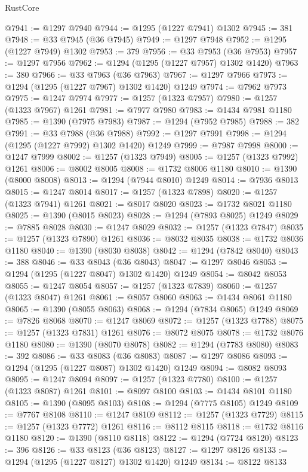 \begin{lexlean}{RustCore}
\begin{coremodule}
@7941 := @1297 @7940
@7944 := @1295 (@1227 @7941) @1302
@7945 := 381
@7948 := @33 @7945 (@36 @7945)
@7949 := @1297 @7948
@7952 := @1295 (@1227 @7949) @1302
@7953 := 379
@7956 := @33 @7953 (@36 @7953)
@7957 := @1297 @7956
@7962 := @1294 (@1295 (@1227 @7957) @1302 @1420)
@7963 := 380
@7966 := @33 @7963 (@36 @7963)
@7967 := @1297 @7966
@7973 := @1294 (@1295 (@1227 @7967) @1302 @1420) @1249
@7974 := @7962 @7973
@7975 := @1247 @7974
@7977 := @1257 (@1323 @7957)
@7980 := @1257 (@1323 @7967) @1261
@7981 := @7977 @7980
@7983 := @1434 @7981 @1180
@7985 := @1390 (@7975 @7983)
@7987 := @1294 (@7952 @7985)
@7988 := 382
@7991 := @33 @7988 (@36 @7988)
@7992 := @1297 @7991
@7998 := @1294 (@1295 (@1227 @7992) @1302 @1420) @1249
@7999 := @7987 @7998
@8000 := @1247 @7999
@8002 := @1257 (@1323 @7949)
@8005 := @1257 (@1323 @7992) @1261
@8006 := @8002 @8005
@8008 := @1732 @8006 @1180
@8010 := @1390 (@8000 @8008)
@8013 := @1294 (@7944 @8010) @1249
@8014 := @7936 @8013
@8015 := @1247 @8014
@8017 := @1257 (@1323 @7898)
@8020 := @1257 (@1323 @7941) @1261
@8021 := @8017 @8020
@8023 := @1732 @8021 @1180
@8025 := @1390 (@8015 @8023)
@8028 := @1294 (@7893 @8025) @1249
@8029 := @7885 @8028
@8030 := @1247 @8029
@8032 := @1257 (@1323 @7847)
@8035 := @1257 (@1323 @7890) @1261
@8036 := @8032 @8035
@8038 := @1732 @8036 @1180
@8040 := @1390 (@8030 @8038)
@8042 := @1294 (@7842 @8040)
@8043 := 388
@8046 := @33 @8043 (@36 @8043)
@8047 := @1297 @8046
@8053 := @1294 (@1295 (@1227 @8047) @1302 @1420) @1249
@8054 := @8042 @8053
@8055 := @1247 @8054
@8057 := @1257 (@1323 @7839)
@8060 := @1257 (@1323 @8047) @1261
@8061 := @8057 @8060
@8063 := @1434 @8061 @1180
@8065 := @1390 (@8055 @8063)
@8068 := @1294 (@7834 @8065) @1249
@8069 := @7826 @8068
@8070 := @1247 @8069
@8072 := @1257 (@1323 @7788)
@8075 := @1257 (@1323 @7831) @1261
@8076 := @8072 @8075
@8078 := @1732 @8076 @1180
@8080 := @1390 (@8070 @8078)
@8082 := @1294 (@7783 @8080)
@8083 := 392
@8086 := @33 @8083 (@36 @8083)
@8087 := @1297 @8086
@8093 := @1294 (@1295 (@1227 @8087) @1302 @1420) @1249
@8094 := @8082 @8093
@8095 := @1247 @8094
@8097 := @1257 (@1323 @7780)
@8100 := @1257 (@1323 @8087) @1261
@8101 := @8097 @8100
@8103 := @1434 @8101 @1180
@8105 := @1390 (@8095 @8103)
@8108 := @1294 (@7775 @8105) @1249
@8109 := @7767 @8108
@8110 := @1247 @8109
@8112 := @1257 (@1323 @7729)
@8115 := @1257 (@1323 @7772) @1261
@8116 := @8112 @8115
@8118 := @1732 @8116 @1180
@8120 := @1390 (@8110 @8118)
@8122 := @1294 (@7724 @8120)
@8123 := 396
@8126 := @33 @8123 (@36 @8123)
@8127 := @1297 @8126
@8133 := @1294 (@1295 (@1227 @8127) @1302 @1420) @1249
@8134 := @8122 @8133

\end{coremodule}
\end{lexlean}
